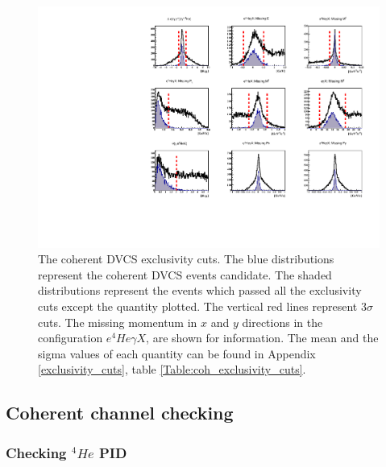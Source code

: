 \begin{figure}[!h]
\centering
\includegraphics[scale=0.9]{fig_Dec2016/all_coh_exc_cuts.pdf}
\caption{The coherent DVCS exclusivity cuts. The blue distributions represent 
   the coherent DVCS events candidate. The shaded distributions represent the 
   events which passed all the exclusivity cuts except the quantity plotted.  
   The vertical red lines represent $3\sigma$ cuts. The missing momentum in $x$ 
   and $y$ directions in the configuration $e^{4}He\gamma X$, are shown for 
information. The mean and the sigma values of each quantity can be found in 
Appendix \ref{exclusivity_cuts}, table \ref{Table:coh_exclusivity_cuts}.} 
\label{fig:coh_exclusivty_cuts}
\end{figure}

\subsection{Coherent channel checking}

\subsubsection{Checking $^{4}He$ PID}

